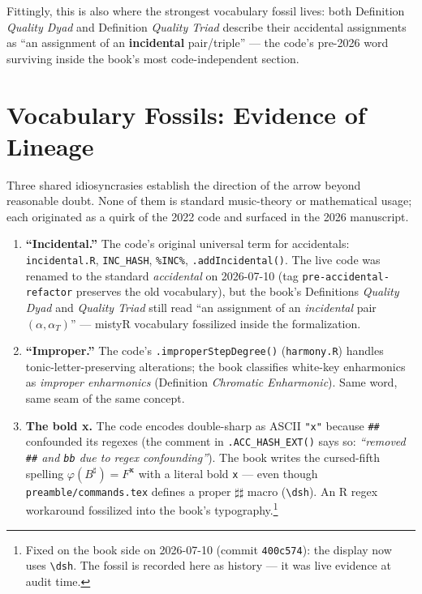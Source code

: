 \documentclass[11pt]{article}
\theoremstyle{definition}
\theoremstyle{remark}
\newcommand{\code}[1]{\texttt{#1}}
\newcommand{\file}[1]{\texttt{#1}}
\begin{document}
Fittingly, this is also where the strongest vocabulary fossil lives: both
Definition \emph{Quality Dyad} and Definition \emph{Quality Triad} describe
their accidental assignments as ``an assignment of an \textbf{incidental}
pair/triple'' --- the code's pre-2026 word surviving inside the book's most
code-independent section.

\section{Vocabulary Fossils: Evidence of Lineage}\label{sec:fossils}

Three shared idiosyncrasies establish the direction of the arrow beyond
reasonable doubt. None of them is standard music-theory or mathematical
usage; each originated as a quirk of the 2022 code and surfaced in the 2026
manuscript.

\begin{enumerate}[leftmargin=2em]
  \item \textbf{``Incidental.''} The code's original universal term for
        accidentals: \file{incidental.R}, \code{INC\_HASH}, \code{\%INC\%},
        \code{.addIncidental()}. The live code was renamed to the standard
        \emph{accidental} on 2026-07-10 (tag \code{pre-accidental-refactor}
        preserves the old vocabulary), but the book's Definitions
        \emph{Quality Dyad} and \emph{Quality Triad} still read ``an assignment
        of an \emph{incidental} pair $(\alpha, \alpha_T)$'' --- mistyR
        vocabulary fossilized inside the formalization.
  \item \textbf{``Improper.''} The code's \code{.improperStepDegree()}
        (\file{harmony.R}) handles tonic-letter-preserving alterations; the book
        classifies white-key enharmonics as \emph{improper enharmonics}
        (Definition \emph{Chromatic Enharmonic}). Same word, same seam of the
        same concept.
  \item \textbf{The bold x.} The code encodes double-sharp as ASCII \code{"x"}
        because \code{\#\#} confounded its regexes (the comment in
        \code{.ACC\_HASH\_EXT()} says so:
        \emph{``removed \code{\#\#} and \code{bb} due to regex confounding''}).
        The book writes the cursed-fifth spelling
        $\varphi(B^{\sharp}) = F^{\mathbf{x}}$ with a literal bold
        \code{x} --- even though \file{preamble/commands.tex} defines a proper
        $\sharp\sharp$ macro (\code{\textbackslash dsh}). An R regex workaround
        fossilized into the book's typography.\footnote{Fixed on the book side
        on 2026-07-10 (commit \code{400c574}): the display now uses
        \code{\textbackslash dsh}. The fossil is recorded here as history ---
        it was live evidence at audit time.}
\end{enumerate}
\end{document}
